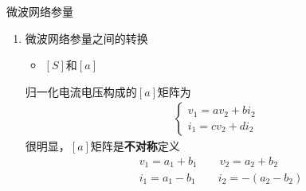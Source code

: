 \begin{frame}{微波网络参量}
    \begin{enumerate}
        \resume
        \item 微波网络参量之间的转换
        \begin{itemize}
            \item $[S]$和$[a]$
        \end{itemize}
        归一化电流电压构成的$[a]$矩阵为
        \begin{align*}
            \begin{cases}
                v_1=av_2+bi_2\\
                i_1=cv_2+di_2
            \end{cases}
        \end{align*}
        很明显，$[a]$矩阵是\textbf{不对称}定义
        \begin{align*}
            &v_1=a_1+b_1 \qquad v_2=a_2+b_2 \\
            &i_1=a_1-b_1 \qquad i_2=-(a_2-b_2)
        \end{align*}
    \end{enumerate}
\end{frame}

